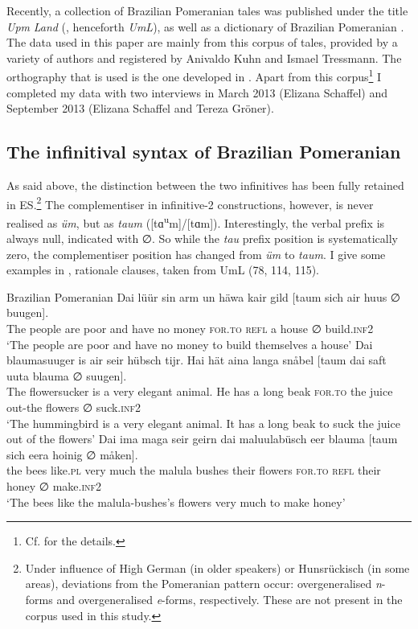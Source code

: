 \documentclass[output=paper,hidelinks,draftmode]{langscibook}
\begin{document}
Recently, a collection of Brazilian Pomeranian tales was published under the title \textit{Upm} \textit{Land} (\citealt{Tressmann2006a}, henceforth \textit{UmL}), as well as a dictionary of Brazilian Pomeranian \citep{Tressmann2006b}. The data used in this paper are mainly from this corpus of tales, provided by a variety of authors and registered by Anivaldo Kuhn and Ismael Tressmann. The orthography that is used is the one developed in \citet{Tressmann2006b}. Apart from this corpus\footnote{Cf. \citet{Postma2014} for the details.} I completed my data with two interviews in March 2013 (Elizana Schaffel) and September 2013 (Elizana Schaffel and Tereza Gröner). 

\subsection{The infinitival syntax of Brazilian Pomeranian}
\largerpage[2]
As said above, the distinction between the two infinitives has been fully retained in ES.\footnote{Under influence of High German (in older speakers) or Hunsrückisch (in some areas), deviations from the Pomeranian pattern occur: overgeneralised \textit{n}-forms and overgeneralised \textit{e}-forms, respectively. These are not present in the corpus used in this study.} The complementiser in infinitive-2 constructions, however, is never realised as \textit{üm}, but as \textit{taum} ([tɑ\textsuperscript{u}m]/[tɑm]). Interestingly, the verbal prefix is always null, indicated with ∅. So while the \textit{tau} prefix position is systematically zero, the complementiser position has changed from \textit{üm} to \textit{taum}. I give some examples in , rationale clauses, taken from UmL (78, 114, 115).


\ea\label{ex:postma:5} Brazilian Pomeranian
\ea\label{ex:postma:5a} \gll Dai lüür sin arm un häwa kair gild [taum sich air huus ∅ buugen].\\
     The people are poor and have no money \textsc{for.to} \textsc{refl} a house ∅ build.\textsc{inf2}\\
\glt {}`The people are poor and have no money to build themselves a house'
\ex\label{ex:postma:5b} \gll Dai blaumasuuger is air seir hübsch tijr. Hai hät aina langa snåbel [taum dai saft uuta blauma ∅ suugen].\\
     The flowersucker is a very elegant animal. He has a long beak \textsc{for.to} the juice out-the flowers ∅ suck.\textsc{inf2}\\
\glt `The hummingbird is a very elegant animal. It has a long beak to suck the juice out of the flowers'
\ex\label{ex:postma:5c} \gll Dai ima maga seir geirn dai maluulabüsch eer blauma [taum sich eera hoinig ∅ måken].\\
     the bees like.\textsc{pl} very much the {malula bushes} their flowers \textsc{for.to} \textsc{refl} their honey ∅ make.\textsc{inf2}\\
\glt `The bees like the malula-bushes's flowers very much to make honey'\z\z
\end{document}
